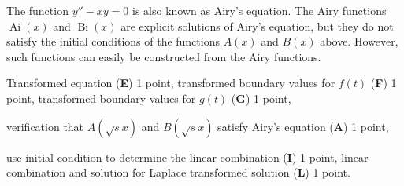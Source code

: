 \begin{diskussion}
The function $y''-xy=0$ is also known as Airy's equation.
The Airy functions $\operatorname{Ai}(x)$ and $\operatorname{Bi}(x)$
are explicit solutions of Airy's equation, but
they do not satisfy the initial conditions of the functions $A(x)$ and $B(x)$
above.
However, such functions can easily be constructed from the Airy functions.
\end{diskussion}

\begin{bewertung}
\begin{teilaufgaben}
\item
Transformed equation ({\bf E}) 1 point,
transformed boundary values for $f(t)$ ({\bf F}) 1 point,
transformed boundary values for $g(t)$ ({\bf G}) 1 point,
\item
verification that $A(\sqrt{s}x)$ and $B(\sqrt{s}x)$ satisfy Airy's
equation ({\bf A}) 1 point,
\item
use initial condition to determine the linear combination ({\bf I}) 1 point,
linear combination and solution for Laplace transformed solution ({\bf L})
1 point.
\end{teilaufgaben}
\end{bewertung}


